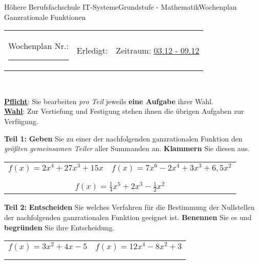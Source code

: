 \documentclass[oneside,openany,headings=optiontotoc,11pt,numbers=noenddot]{scrreprt}
\begin{document}
	\begin{worksheet}{Höhere Berufsfachschule IT-Systeme}{Grundstufe - Mathematik}{Wochenplan Ganzrationale Funktionen}
		\noindent
		\begin{tabularx}{\textwidth}{XXl}
			Wochenplan Nr.: \rule{0.15\textwidth}{1pt} & Erledigt: & Zeitraum: \underline{03.12 - 09.12}
		\end{tabularx}\\
		\par\noindent
		\textbf{\underline{Pflicht}}: Sie bearbeiten \textit{pro Teil} jeweils \textbf{eine Aufgabe} ihrer Wahl.\\
		\underline{\textbf{Wahl}}: Zur Vertiefung und Festigung stehen ihnen die übrigen Aufgaben zur Verfügung.
		\begin{framed}
			\noindent
			\textbf{Teil 1:} \textbf{Geben} Sie zu einer der nachfolgenden ganzrationalen Funktion den \textit{größten gemeinsamen Teiler} aller Summanden an. \textbf{Klammern} Sie diesen aus.\\
			\par\noindent
			\begin{tabularx}{\textwidth}{M|M}
				\(f(x) = 2x^4 + 27x^3 + 15x\) & \(f(x) = 7x^6 - 2x^4 + 3x^3 + 6,5x^2\)\\
				\\
				\hline
				\\
			\end{tabularx}
		\end{framed}
		\begin{framed}
			\noindent
			\textbf{Teil 2:} \textbf{Entscheiden} Sie welches Verfahren für die Bestimmung der Nullstellen der nachfolgenden ganzrationalen Funktion geeignet ist. \textbf{Benennen} Sie es und \textbf{begründen} Sie ihre Entscheidung.\\
			\par\noindent
			\begin{tabularx}{\textwidth}{M|M}
				\(f(x) = 3x^2 + 4x -5\) & \(f(x) = 12x^4 - 8x^2 + 3\)\\
				\\
				\hline
				\multicolumn{2}{c}{}\\

\end{tabularx}
\end{framed}
\end{worksheet}
\end{document}
